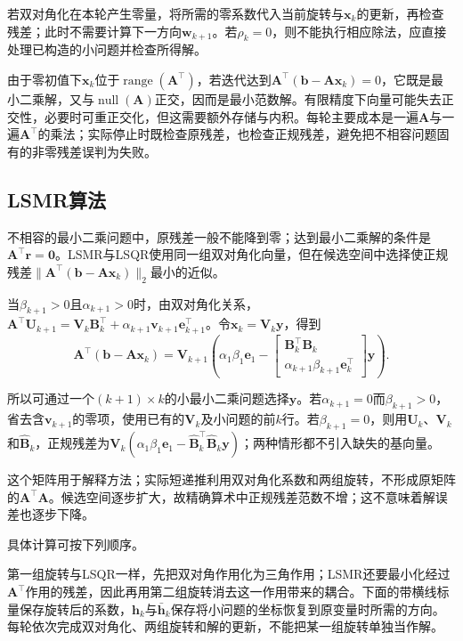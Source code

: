若双对角化在本轮产生零量，将所需的零系数代入当前旋转与$\bm x_k$的更新，再检查残差；此时不需要计算下一方向$\bm w_{k+1}$。若$\rho_k=0$，则不能执行相应除法，应直接处理已构造的小问题并检查所得解。

由于零初值下$\bm x_k$位于$\operatorname{range}(\bm A^\top)$，若迭代达到$\bm A^\top(\bm b-\bm A\bm x_k)=0$，它既是最小二乘解，又与$\operatorname{null}(\bm A)$正交，因而是最小范数解。有限精度下向量可能失去正交性，必要时可重正交化，但这需要额外存储与内积。每轮主要成本是一遍$\bm A$与一遍$\bm A^\top$的乘法；实际停止时既检查原残差，也检查正规残差，避免把不相容问题固有的非零残差误判为失败。

\subsection{LSMR算法}
\label{sec:ls-lsmr}

不相容的最小二乘问题中，原残差一般不能降到零；达到最小二乘解的条件是$\bm A^\top\bm r=\bm0$。LSMR与LSQR使用同一组双对角化向量，但在候选空间中选择使正规残差$\lVert\bm A^\top(\bm b-\bm A\bm x_k)\rVert_2$最小的近似。

当$\beta_{k+1}>0$且$\alpha_{k+1}>0$时，由双对角化关系，$\bm A^\top\bm U_{k+1}=\bm V_k\bm B_k^\top+\alpha_{k+1}\bm v_{k+1}\bm e_{k+1}^\top$。令$\bm x_k=\bm V_k\bm y$，得到
\[
 \bm A^\top(\bm b-\bm A\bm x_k)
 =\bm V_{k+1}\left(\alpha_1\beta_1\bm e_1-
 \begin{bmatrix}\bm B_k^\top\bm B_k\\
 \alpha_{k+1}\beta_{k+1}\bm e_k^\top\end{bmatrix}\bm y\right).
\]

所以可通过一个$(k+1)\times k$的小最小二乘问题选择$\bm y$。若$\alpha_{k+1}=0$而$\beta_{k+1}>0$，省去含$\bm v_{k+1}$的零项，使用已有的$\bm V_k$及小问题的前$k$行。若$\beta_{k+1}=0$，则用$\bm U_k$、$\bm V_k$和$\widehat{\bm B}_k$，正规残差为$\bm V_k(\alpha_1\beta_1\bm e_1-\widehat{\bm B}_k^\top\widehat{\bm B}_k\bm y)$；两种情形都不引入缺失的基向量。

这个矩阵用于解释方法；实际短递推利用双对角化系数和两组旋转，不形成原矩阵的$\bm A^\top\bm A$。候选空间逐步扩大，故精确算术中正规残差范数不增；这不意味着解误差也逐步下降。

具体计算可按下列顺序。

第一组旋转与LSQR一样，先把双对角作用化为三角作用；LSMR还要最小化经过$\bm A^\top$作用的残差，因此再用第二组旋转消去这一作用带来的耦合。下面的带横线标量保存旋转后的系数，$\bm h_k$与$\bar{\bm h}_k$保存将小问题的坐标恢复到原变量时所需的方向。每轮依次完成双对角化、两组旋转和解的更新，不能把某一组旋转单独当作解。

